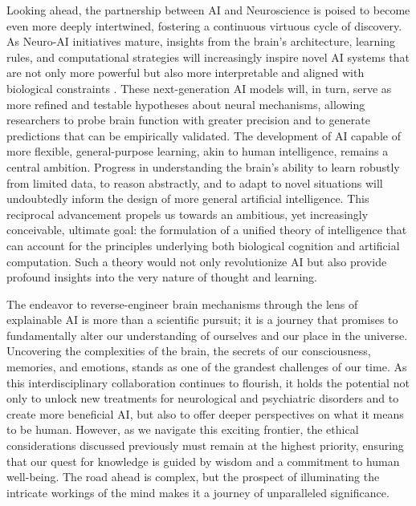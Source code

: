 Looking ahead, the partnership between AI and Neuroscience is poised to become even more deeply intertwined, fostering a continuous virtuous cycle of discovery. As Neuro-AI initiatives mature, insights from the brain's architecture, learning rules, and computational strategies will increasingly inspire novel AI systems that are not only more powerful but also more interpretable and aligned with biological constraints \cite{richards2019deep, kriegeskorte2018cognitive}. These next-generation AI models will, in turn, serve as more refined and testable hypotheses about neural mechanisms, allowing researchers to probe brain function with greater precision and to generate predictions that can be empirically validated. The development of AI capable of more flexible, general-purpose learning, akin to human intelligence, remains a central ambition. Progress in understanding the brain's ability to learn robustly from limited data, to reason abstractly, and to adapt to novel situations will undoubtedly inform the design of more general artificial intelligence. This reciprocal advancement propels us towards an ambitious, yet increasingly conceivable, ultimate goal: the formulation of a unified theory of intelligence that can account for the principles underlying both biological cognition and artificial computation. Such a theory would not only revolutionize AI but also provide profound insights into the very nature of thought and learning.

The endeavor to reverse-engineer brain mechanisms through the lens of explainable AI is more than a scientific pursuit; it is a journey that promises to fundamentally alter our understanding of ourselves and our place in the universe. Uncovering the complexities of the brain, the secrets of our consciousness, memories, and emotions, stands as one of the grandest challenges of our time. As this interdisciplinary collaboration continues to flourish, it holds the potential not only to unlock new treatments for neurological and psychiatric disorders and to create more beneficial AI, but also to offer deeper perspectives on what it means to be human. However, as we navigate this exciting frontier, the ethical considerations discussed previously must remain at the highest priority, ensuring that our quest for knowledge is guided by wisdom and a commitment to human well-being. The road ahead is complex, but the prospect of illuminating the intricate workings of the mind makes it a journey of unparalleled significance.

\clearpage